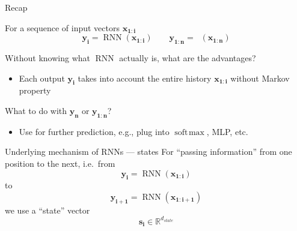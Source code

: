 \documentclass[12pt,aspectratio=169,handout]{beamer}
\DeclareMathOperator*{\softmax}{soft\!\max}
\DeclareMathOperator*{\rnn}{RNN}
\DeclareMathOperator*{\rnnstar}{RNN^{*}}
\begin{document}
\begin{frame}{Recap}

For a sequence of input vectors  $\bm{x_{1:i}}$
$$
\bm{y_i} = \rnn (\bm{x_{1:i}}) \qquad
\bm{y_{1:n}} = \rnnstar (\bm{x_{1:n}})
$$

\pause

Without knowing what $\rnn$ actually is, what are the advantages?
\pause
\begin{itemize}
	\item Each output $\bm{y_i}$ takes into account the entire history $\bm{x_{1:i}}$ without Markov property
\end{itemize}

What to do with $\bm{y_n}$ or $\bm{y_{1:n}}$?
\pause
\begin{itemize}
	\item Use for further prediction, e.g., plug into $\softmax$, MLP, etc.
\end{itemize}

\end{frame}



\begin{frame}{Underlying mechanism of RNNs --- states}
For ``passing information'' from one position to the next, i.e.\ from
$$\bm{y_i} = \rnn (\bm{x_{1:i}})$$
to
$$\bm{y_{i+1}} = \rnn (\bm{x_{1:i+1}})$$
we use a ``state'' vector
$$\bm{s_i} \in \mathbb{R}^{d_{state}}$$
\end{frame}
\end{document}
